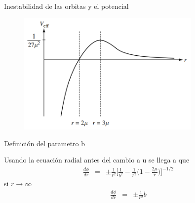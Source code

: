 \documentclass[xcolor=dvipsnames]{beamer}
\begin{document}
\begin{frame}{Inestabilidad de las orbitas y el potencial}
    \begin{figure}
        \centering
        \includegraphics[width=0.8\textwidth]{Presentations/Images/3_poten.png}
    \end{figure}
\end{frame}


\begin{frame}{Definición del parametro b}
    \begin{block}{}
    Usando la ecuación radial antes del cambio a u se llega a que
    \begin{eqnarray*}
    \frac{d\phi}{dr}&=&\pm \frac{1}{r^{2}}\Big[ \frac{1}{b^{2}} -\frac{1}{r^{2}}\Big(1-\frac{2\mu}{r} \Big) \Big]^{-1/2}
    \end{eqnarray*}
    si $r \rightarrow \infty$
    \begin{eqnarray*}
    \frac{d\phi}{dr}&=&\pm \frac{1}{r^{2}}b\\
    \end{eqnarray*}
    \end{block}
\end{frame}
\end{document}
